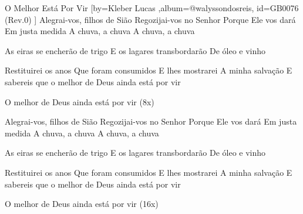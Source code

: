\beginsong
{O Melhor Está Por Vir %
}[by={Kleber Lucas %
},album={@walyssondosreis},
id={GB0076 %
(Rev.0) %
}]
Alegrai-vos, filhos de Sião
Regozijai-vos no Senhor
Porque Ele vos dará
Em justa medida
A chuva, a chuva
A chuva, a chuva

As eiras se encherão de trigo
E os lagares transbordarão
De óleo e vinho

Restituirei os anos
Que foram consumidos
E lhes mostrarei
A minha salvação
E sabereis que o melhor de Deus ainda está por vir

O melhor de Deus ainda está por vir (8x)

Alegrai-vos, filhos de Sião
Regozijai-vos no Senhor
Porque Ele vos dará
Em justa medida
A chuva, a chuva
A chuva, a chuva

As eiras se encherão de trigo
E os lagares transbordarão
De óleo e vinho

Restituirei os anos
Que foram consumidos
E lhes mostrarei
A minha salvação
E sabereis que o melhor de Deus ainda está por vir

O melhor de Deus ainda está por vir (16x)


